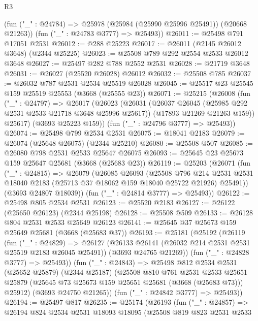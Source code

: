 \begin{lexlean}{R3}
\begin{coremodule}
      (fun ("_" : @24784) => @25978 (@25984 (@25990 @25996 @25491)) (@20668 @21263))
      (fun ("_" : @24783 @3777) => @25493))
@26011 := @25498 @791 @17051 @2531
@26012 := @288 @25223
@26017 := @26011 (@2145 @26012 @3648) (@2344 @25225)
@26023 := @25508 @789 @292 @2554 @2533 @26012 @3648
@26027 := @25497 @282 @788 @2552 @2531
@26028 := @21719 @3648
@26031 := @26027 (@25520 @26028) @26012
@26032 := @25508 @785
@26037 := @26032 @787 @2531 @2534 @25519 @26028
@26045 := @25517 @23 @25545 @159 @25519 @25553 (@3668 (@25555 @23))
@26071 := @25215
    (@26008
      (fun ("_" : @24797) =>
      @26017
        (@26023
          (@26031
            (@26037 @26045 (@25985 @292 @2531 @2533 @21718 @3648 @25996 @25617))
            (@17893 @21269 @21263 @159))
          @25617)
        (@3693 @25223 @159))
      (fun ("_" : @24796 @3777) => @25493))
@26074 := @25498 @799 @2534 @2531
@26075 := @18041 @2183
@26079 := @26074 (@25648 @26075) (@2344 @25210)
@26080 := @25508 @507
@26085 := @26080 @798 @2531 @2533 @25647 @26075
@26093 := @25645 @23 @25673 @159 @25647 @25681 (@3668 (@25683 @23))
@26119 := @25203
    (@26071
      (fun ("_" : @24815) =>
      @26079
        (@26085
          @26093
          (@25508
            @796
            @214
            @2531
            @2531
            @18040
            @2183
            (@25713 @37 @18062 @159 @18040 @25722 @21926)
            @25491))
        (@3693 @24807 @18039))
      (fun ("_" : @24814 @3777) => @25493))
@26122 := @25498 @805 @2534 @2531
@26123 := @25520 @2183
@26127 := @26122 (@25650 @26123) (@2344 @25198)
@26128 := @25508 @509
@26133 := @26128 @804 @2531 @2533 @25649 @26123
@26141 := @25645 @37 @25673 @159 @25649 @25681 (@3668 (@25683 @37))
@26193 := @25181
    (@25192
      (@26119
        (fun ("_" : @24829) =>
        @26127
          (@26133 @26141 (@26032 @214 @2531 @2531 @25519 @2183 @26045 @25491))
          (@3693 @24765 @21269))
        (fun ("_" : @24828 @3777) => @25493))
      (fun ("_" : @24843) =>
      @25498
        @812
        @2534
        @2531
        (@25652 @25879)
        (@2344 @25187)
        (@25508
          @810
          @761
          @2531
          @2533
          @25651
          @25879
          (@25645 @73 @25673 @159 @25651 @25681 (@3668 (@25683 @73)))
          @25912)
        (@3693 @24750 @21265))
      (fun ("_" : @24842 @3777) => @25493))
@26194 := @25497 @817
@26235 := @25174
    (@26193
      (fun ("_" : @24857) =>
      @26194
        @824
        @2534
        @2531
        @18093
        @18095
        (@25508
          @819
          @823
          @2531
          @2533

\end{coremodule}
\end{lexlean}
